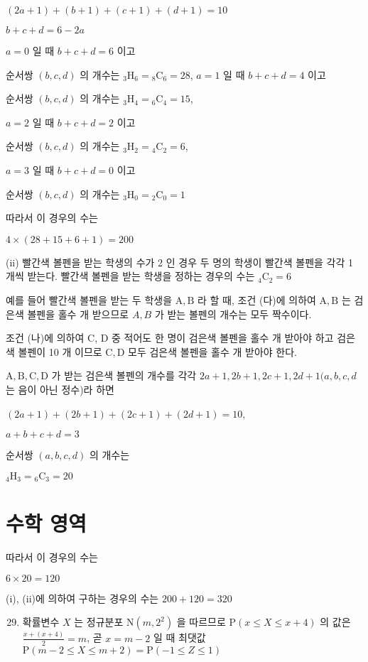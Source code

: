 \documentclass[10pt]{article}
\begin{document}
\((2 a+1)+(b+1)+(c+1)+(d+1)=10\)

\(b+c+d=6-2 a\)

\(a=0\) 일 때 \(b+c+d=6\) 이고

순서쌍 \((b, c, d)\) 의 개수는 \({ }_{3} \mathrm{H}_{6}={ }_{8} \mathrm{C}_{6}=28\), \(a=1\) 일 때 \(b+c+d=4\) 이고

순서쌍 \((b, c, d)\) 의 개수는 \({ }_{3} \mathrm{H}_{4}={ }_{6} \mathrm{C}_{4}=15\),

\(a=2\) 일 때 \(b+c+d=2\) 이고

순서쌍 \((b, c, d)\) 의 개수는 \({ }_{3} \mathrm{H}_{2}={ }_{4} \mathrm{C}_{2}=6\),

\(a=3\) 일 때 \(b+c+d=0\) 이고

순서쌍 \((b, c, d)\) 의 개수는 \({ }_{3} \mathrm{H}_{0}={ }_{2} \mathrm{C}_{0}=1\)

따라서 이 경우의 수는

\(4 \times(28+15+6+1)=200\)

(ii) 빨간색 볼펜을 받는 학생의 수가 2 인 경우 두 명의 학생이 빨간색 볼펜을 각각 1 개씩 받는다. 빨간색 볼펜을 받는 학생을 정하는 경우의 수는 \({ }_{4} \mathrm{C}_{2}=6\)

예를 들어 빨간색 볼펜을 받는 두 학생을 \(\mathrm{A}, \mathrm{B}\) 라 할 때, 조건 (다)에 의하여 \(\mathrm{A}, \mathrm{B}\) 는 검은색 볼펜을 홀수 개 받으므로 \(A, B\) 가 받는 볼펜의 개수는 모두 짝수이다.

조건 (나)에 의하여 C, D 중 적어도 한 명이 검은색 볼펜을 홀수 개 받아야 하고 검은색 볼펜이 10 개 이므로 \(\mathrm{C}, \mathrm{D}\) 모두 검은색 볼펜을 홀수 개 받아야 한다.

\(\mathrm{A}, \mathrm{B}, \mathrm{C}, \mathrm{D}\) 가 받는 검은색 볼펜의 개수를 각각 \(2 a+1,2 b+1,2 c+1,2 d+1(a, b, c, d\) 는 음이 아닌 정수)라 하면

\((2 a+1)+(2 b+1)+(2 c+1)+(2 d+1)=10\),

\(a+b+c+d=3\)

순서쌍 \((a, b, c, d)\) 의 개수는

\({ }_{4} \mathrm{H}_{3}={ }_{6} \mathrm{C}_{3}=20\)

\section*{수학 영역}
따라서 이 경우의 수는

\(6 \times 20=120\)

(i), (ii)에 의하여 구하는 경우의 수는 \(200+120=320\)

\begin{enumerate}
  \setcounter{enumi}{28}
  \item 확률변수 \(X\) 는 정규분포 \(\mathrm{N}\left(m, 2^{2}\right)\) 을 따르므로 \(\mathrm{P}(x \leq X \leq x+4)\) 의 값은 \(\frac{x+(x+4)}{2}=m\), 곧 \(x=m-2\) 일 때 최댓값 \(\mathrm{P}(m-2 \leq X \leq m+2)=\mathrm{P}(-1 \leq Z \leq 1)\)
\end{enumerate}
\end{document}
